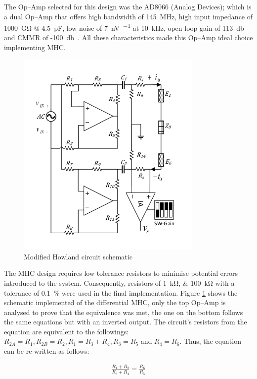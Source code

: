 The Op–Amp selected for this design was the AD8066 (Analog Devices); which is a dual Op–Amp that offers high bandwidth of \SI{145}{\mega\hertz}, high input impedance of \SI{1000}{\giga\ohm} @ \SI{4.5}{\pF}, low noise of \SI{7}{\nano\volt\per{}} at \SI{10}{\kilo\hertz}, open loop gain of \SI{113}{\decibel} and CMMR of -\SI{100}{\decibel}~\cite{ad:AD8066}. All these characteristics made this Op–Amp ideal choice implementing MHC.

\begin{figure}[!htpb]
	\centering
	\includegraphics[width=9cm,keepaspectratio]{figure3}  
    \caption{Modified Howland circuit schematic}
    \label{fig:mhc}
\end{figure}

The MHC design requires low tolerance resistors to minimise potential errors introduced to the system. Consequently, resistors of \SIlist{1;100}{\kohm} with a tolerance of \SI{0.1}{\percent} were used in the final implementation. Figure \ref{fig:mhc} shows the schematic implemented of the differential MHC, only the top Op–Amp is analysed to prove that the equivalence was met, the one on the bottom follows the same equations but with an inverted output. The circuit’s resistors from the equation are equivalent to the followings: $R_{2A}=R_1, R_{2B}=R_2, R_1 = R_3 + R_4, R_3 = R_5$ and $R_4 = R_6$. Thus, the equation can be re-written as follows: 

\begin{align}
\label{eq:Req}
\frac{R_1 + R_2}{R_3 + R_4} = \frac{R_6}{R_5}
\end{align}

